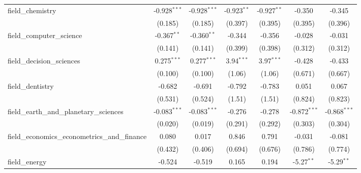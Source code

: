 \begin{tabular}{lcccccc}
   field\_chemistry                                            & -0.928$^{***}$ & -0.928$^{***}$ & -0.923$^{**}$  & -0.927$^{**}$  & -0.350         & -0.345\\   
                                                               & (0.185)        & (0.185)        & (0.397)        & (0.395)        & (0.395)        & (0.396)\\   
   field\_computer\_science                                    & -0.367$^{**}$  & -0.360$^{**}$  & -0.344         & -0.356         & -0.028         & -0.031\\   
                                                               & (0.141)        & (0.141)        & (0.399)        & (0.398)        & (0.312)        & (0.312)\\   
   field\_decision\_sciences                                   & 0.275$^{***}$  & 0.277$^{***}$  & 3.94$^{***}$   & 3.97$^{***}$   & -0.428         & -0.433\\   
                                                               & (0.100)        & (0.100)        & (1.06)         & (1.06)         & (0.671)        & (0.667)\\   
   field\_dentistry                                            & -0.682         & -0.691         & -0.792         & -0.783         & 0.051          & 0.067\\   
                                                               & (0.531)        & (0.524)        & (1.51)         & (1.51)         & (0.824)        & (0.823)\\   
   field\_earth\_and\_planetary\_sciences                      & -0.083$^{***}$ & -0.083$^{***}$ & -0.276         & -0.278         & -0.872$^{***}$ & -0.868$^{***}$\\   
                                                               & (0.020)        & (0.019)        & (0.291)        & (0.292)        & (0.303)        & (0.304)\\   
   field\_economics\_econometrics\_and\_finance                & 0.080          & 0.017          & 0.846          & 0.791          & -0.031         & -0.081\\   
                                                               & (0.432)        & (0.406)        & (0.694)        & (0.676)        & (0.786)        & (0.774)\\   
   field\_energy                                               & -0.524         & -0.519         & 0.165          & 0.194          & -5.27$^{**}$   & -5.29$^{**}$\\   

\end{tabular}
